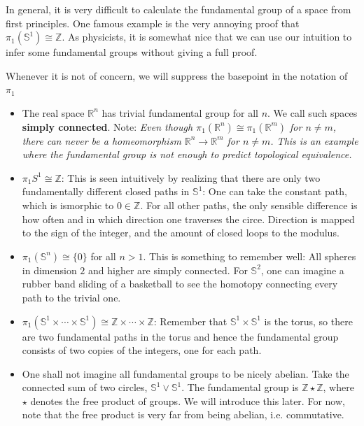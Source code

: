 \begin{remark}
    In general, it is very difficult to calculate the fundamental group of a space from first principles. One famous example is the very annoying proof that $\pi_1(\mathbb{S}^1) \cong \mathbb{Z}$. As physicists, it is somewhat nice that we can use our intuition to infer some fundamental groups without giving a full proof.
\end{remark}
\begin{eg} 
    Whenever it is not of concern, we will suppress the basepoint in the notation of $\pi_1$
    \begin{itemize}
    \item The real space $\mathbb{R}^n$ has trivial fundamental group for all $n$. We call such spaces \textbf{simply connected}. Note: \emph{Even though $\pi_1(\mathbb{R}^n) \cong \pi_1(\mathbb{R}^m)$ for $n \neq m$, there can never be a homeomorphism $\mathbb{R}^n \to \mathbb{R}^m$ for $n \neq m$. This is an example where the fundamental group is not enough to predict topological equivalence.}
    \item $\pi_1{S^1} \cong \mathbb{Z}$: This is seen intuitively by realizing that there are only two fundamentally different closed paths in $\mathbb{S}^1$: One can take the constant path, which is ismorphic to $0 \in \mathbb{Z}$.  For all other paths, the only sensible difference is how often and in which direction one traverses the circe. Direction is mapped to the sign of the integer, and the amount of closed loops to the modulus.
    \item $\pi_1(\mathbb{S}^n)\cong \{0\}$ for all $n>1$. This is something to remember well: All spheres in dimension $2$ and higher are simply connected. For $\mathbb{S}^2$, one can imagine a rubber band sliding of a basketball to see the homotopy connecting every path to the trivial one.
    \item $\pi_1(\mathbb{S}^1 \times \cdots \times \mathbb{S}^1) \cong \mathbb{Z} \times \cdots \times \mathbb{Z}$: Remember that $\mathbb{S}^1 \times \mathbb{S}^1$ is the torus, so there are two fundamental paths in the torus and hence the fundamental group consists of two copies of the integers, one for each path.
    \item One shall not imagine all fundamental groups to be nicely abelian. Take the connected sum of two circles, $\mathbb{S}^1 \vee \mathbb{S}^1$. The fundamental group is $\mathbb{Z} \star \mathbb{Z}$, where $\star$ denotes the free product of groups. We will introduce this later. For now, note that the free product is very far from being abelian, i.e. commutative.
    \end{itemize}
\end{eg}
